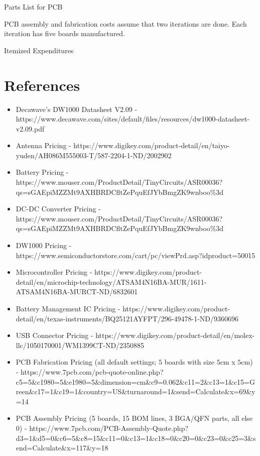\documentclass{article}
\begin{document}
\FloatBarrier

 \begin{table}[h!]
 	\centering
 	\caption{Parts List for PCB}
 	\label{tab:partslist}
\end{table}

\FloatBarrier

PCB assembly and fabrication costs assume that two iterations are done.
Each iteration has five boards manufactured.

\FloatBarrier

\begin{table}[h!]
  	\centering
  	\caption{Itemized Expenditures}
  	\label{tab:costs}
\end{table}

\FloatBarrier

\section{References}
\begin{itemize}
\item Decawave's DW1000 Datasheet V2.09 - https://www.decawave.com/sites/default/files/resources/dw1000-datasheet-v2.09.pdf
\item Antenna Pricing - https://www.digikey.com/product-detail/en/taiyo-yuden/AH086M555003-T/587-2204-1-ND/2002902 
\item Battery Pricing - https://www.mouser.com/ProductDetail/TinyCircuits/ASR00036?qs=sGAEpiMZZMt9AXHBRDCfltZePquEfJYbBmgZK9wnboo\%3d
\item DC-DC Converter Pricing - https://www.mouser.com/ProductDetail/TinyCircuits/ASR00036?qs=sGAEpiMZZMt9AXHBRDCfltZePquEfJYbBmgZK9wnboo\%3d
\item DW1000 Pricing - https://www.semiconductorstore.com/cart/pc/viewPrd.asp?idproduct=50015
\item Microcontroller Pricing - https://www.digikey.com/product-detail/en/microchip-technology/ATSAM4N16BA-MUR/1611-ATSAM4N16BA-MURCT-ND/6832601
\item Battery Management IC Pricing - https://www.digikey.com/product-detail/en/texas-instruments/BQ25121AYFPT/296-49478-1-ND/9360696
\item USB Connector Pricing - https://www.digikey.com/product-detail/en/molex-llc/1050170001/WM1399CT-ND/2350885
\item PCB Fabrication Pricing (all default settings; $5$ boards with size $5$cm x $5$cm) - https://www.7pcb.com/pcb-quote-online.php?c5=5\&c1980=5\&e1980=5\&dimension=cm\&c9=0.062\&c11=2\&c13=1\&c15=Green\&c17=1\&c19=1\&country=US\&turnaround=1\&send=Calculate\&x=69\&y=14
\item PCB Assembly Pricing (5 boards, 15 BOM lines, 3 BGA/QFN parts, all else 0) - https://www.7pcb.com/PCB-Assembly-Quote.php?d3=1\&d5=0\&c6=5\&c8=15\&c11=0\&c13=1\&c18=0\&c20=0\&c23=0\&c25=3\&send=Calculate\&x=117\&y=18
\end{itemize}
\end{document}
